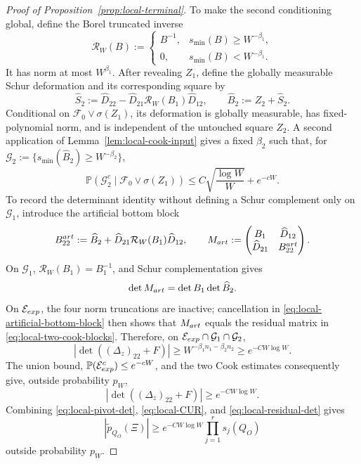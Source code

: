 \documentclass[10pt,a4paper]{amsart}
\renewcommand{\P}{\mathbb P}
\begin{document}
\begin{proof}[Proof of Proposition~\ref{prop:local-terminal}]
To make the second conditioning global, define the Borel truncated inverse
\begin{equation}
 \mathcal R_W(B):=
 \begin{cases}
  B^{-1},&s_{\min}(B)\geq W^{-\beta_1},\\
  0,&s_{\min}(B)<W^{-\beta_1}.
 \end{cases}
 \label{eq:local-truncated-inverse}
\end{equation}
It has norm at most \(W^{\beta_1}\).  After revealing \(Z_1\), define
the globally measurable Schur deformation and its corresponding square by
\begin{equation}
 \widehat S_2:=\widehat D_{22}
 -\widehat D_{21}\mathcal R_W(B_1)\widehat D_{12},
 \qquad \widehat B_2:=Z_2+\widehat S_2.
 \label{eq:local-second-schur}
\end{equation}
Conditional on \(\mathcal F_0\vee\sigma(Z_1)\), its deformation is
globally measurable, has fixed-polynomial norm, and is independent of the
untouched square \(Z_2\).  A second application of
Lemma~\ref{lem:local-cook-input} gives a fixed \(\beta_2\) such that, for
\(\mathcal G_2:=\{s_{\min}(\widehat B_2)\geq W^{-\beta_2}\}\),
\begin{equation}
 \P(\mathcal G_2^c\mid\mathcal F_0\vee\sigma(Z_1))
 \leq C\sqrt{\frac{\log W}{W}}+e^{-cW}.
 \label{eq:local-cook-two}
\end{equation}
To record the determinant identity without defining a Schur complement
only on \(\mathcal G_1\), introduce the artificial bottom block
\begin{equation}
 B_{22}^{\rm art}:=\widehat B_2+\widehat D_{21}
        \mathcal R_W(B_1)\widehat D_{12},
 \qquad
 M_{\rm art}:=
 \begin{pmatrix}B_1&\widehat D_{12}\\
                 \widehat D_{21}&B_{22}^{\rm art}\end{pmatrix}.
 \label{eq:local-artificial-bottom-block}
\end{equation}
On \(\mathcal G_1\), \(\mathcal R_W(B_1)=B_1^{-1}\), and Schur
complementation gives
\[
 \det M_{\rm art}=\det B_1\det\widehat B_2.
\]
On \(\mathcal E_{\rm exp}\), the four norm truncations are inactive;
cancellation in \eqref{eq:local-artificial-bottom-block} then shows that
\(M_{\rm art}\) equals the residual matrix in
\eqref{eq:local-two-cook-blocks}.  Therefore, on
\(\mathcal E_{\rm exp}\cap\mathcal G_1\cap\mathcal G_2\),
\[
 |\det((\Delta_z)_{22}+F)|
 \geq W^{-\beta_1n_1-\beta_2n_2}
 \geq e^{-CW\log W}.
\]
The union bound, \(\P(\mathcal E_{\rm exp}^c)\leq e^{-cW}\), and the two
Cook estimates consequently give, outside probability \(p_W\),
\begin{equation}
 |\det((\Delta_z)_{22}+F)|\geq e^{-CW\log W}.
 \label{eq:local-residual-det}
\end{equation}
Combining \eqref{eq:local-pivot-det}, \eqref{eq:local-CUR}, and
\eqref{eq:local-residual-det} gives
\begin{equation}
 |\widetilde p_{Q_O}(\Xi)|
 \geq e^{-CW\log W}\prod_{j=1}^r s_j(Q_O)
 \label{eq:local-value-lower}
\end{equation}
outside probability \(p_W\).


\end{proof}
\end{document}
